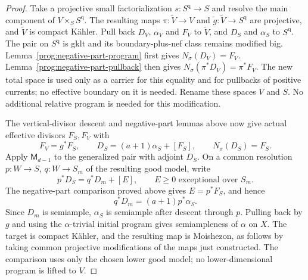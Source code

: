 \begin{proof}
Take a projective small factorialization $s:S^{\mathrm q}\to S$
and resolve the main component of $V\times_S S^{\mathrm q}$.
The resulting maps $\pi:\widetilde V\to V$ and
$\widetilde g:\widetilde V\to S^{\mathrm q}$ are projective,
and $\widetilde V$ is compact K\"ahler. Pull back $D_V$,
$\alpha_V$ and $F_V$ to $\widetilde V$, and $D_S$ and
$\alpha_S$ to $S^{\mathrm q}$. The pair on $S^{\mathrm q}$ is
gklt and its boundary-plus-nef class remains modified big.
Lemma~\ref{prog:negative-part-program} first gives
$N_\sigma(D_V)=F_V$. Lemma~\ref{prog:negative-part-pullback} then gives
$N_\sigma(\pi^*D_V)=\pi^*F_V$. The new total space is used only as a
carrier for this equality and for pullbacks of positive currents;
no effective boundary on it is needed. Rename these spaces $V$
and $S$. No additional relative program is needed for this modification.

The vertical-divisor descent and negative-part lemmas above now
give actual effective divisors $F_S,F_V$ with
\[
 F_V=g^*F_S,\qquad
 D_S=(a+1)\alpha_S+[F_S],\qquad N_\sigma(D_S)=F_S.
\]
Apply $\mathsf M_{d-1}$ to the generalized pair with adjoint $D_S$.
On a common resolution $p:W\to S$, $q:W\to S_m$ of the resulting
good model, write
\[
 p^*D_S=q^*D_m+[E],\qquad E\geq0
 \text{ exceptional over }S_m.
\]
The negative-part comparison proved above gives
$E=p^*F_S$, and hence
\[
 q^*D_m=(a+1)p^*\alpha_S.
\]
Since $D_m$ is semiample, $\alpha_S$ is semiample after descent
through $p$. Pulling back by $g$ and using the
$\alpha$-trivial initial program gives semiampleness of
$\alpha$ on $X$. The target is compact K\"ahler, and the
resulting map is Moishezon, as follows by taking common projective
modifications of the maps just constructed. The comparison uses only the chosen lower good model; no
lower-dimensional program is lifted to $V$.

\end{proof}

